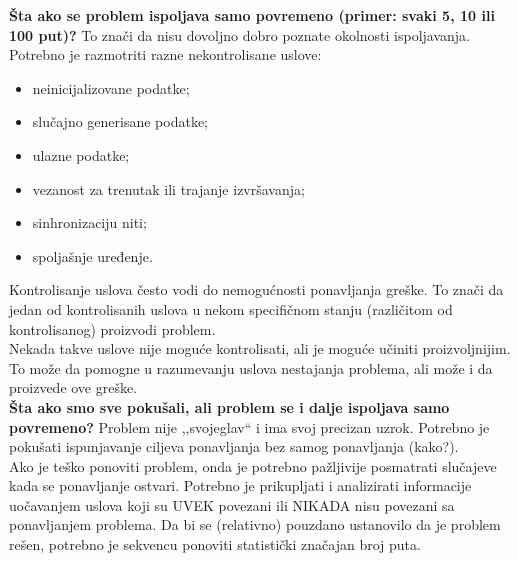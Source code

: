 \documentclass[a4paper]{article}
\begin{document}
  \textbf{Šta ako se problem ispoljava samo povremeno (primer: svaki 5, 10 ili 100 put)?} To znači
  da nisu dovoljno dobro poznate okolnosti ispoljavanja. Potrebno je razmotriti razne 
  nekontrolisane uslove:
  \begin{itemize}
    \item neinicijalizovane podatke;
    \item slučajno generisane podatke;
    \item ulazne podatke;
    \item vezanost za trenutak ili trajanje izvršavanja;
    \item sinhronizaciju niti;
    \item spoljašnje uređenje.
  \end{itemize} 
  
  Kontrolisanje uslova često vodi do nemogućnosti ponavljanja greške. To znači da jedan od kontrolisanih
  uslova u nekom specifičnom stanju (različitom od kontrolisanog) proizvodi problem.\\
  \indent Nekada takve uslove nije moguće kontrolisati, ali je moguće učiniti proizvoljnijim. To
  može da pomogne u razumevanju uslova nestajanja problema, ali može i da proizvede ove greške.\\
  
  \textbf{Šta ako smo sve pokušali, ali problem se i dalje ispoljava samo povremeno?} Problem
  nije ,,svojeglav`` i ima svoj precizan uzrok. Potrebno je pokušati ispunjavanje ciljeva ponavljanja
  bez samog ponavljanja (kako?). \\
  \indent Ako je teško ponoviti problem, onda je potrebno pažljivije posmatrati slučajeve
  kada se ponavljanje ostvari. Potrebno je prikupljati i analizirati informacije uočavanjem
  uslova koji su UVEK povezani ili NIKADA nisu povezani sa ponavljanjem problema. Da bi se
  (relativno) pouzdano ustanovilo da je problem rešen, potrebno je sekvencu ponoviti statistički
  značajan broj puta.
\end{document}
